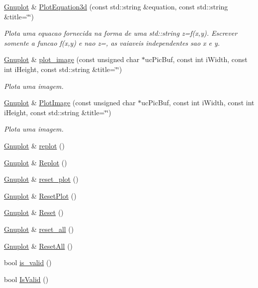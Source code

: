 \begin{DoxyCompactItemize}
\hyperlink{class_gnuplot}{Gnuplot} \& \hyperlink{class_gnuplot_a545ea6339c234d277339ab148cd11dba}{Plot\+Equation3d} (const std\+::string \&equation, const std\+::string \&title=\char`\"{}\char`\"{})
\begin{DoxyCompactList}\small\item\em Plota uma equacao fornecida na forma de uma std\+::string z=f(x,y). Escrever somente a funcao f(x,y) e nao z=, as vaiaveis independentes sao x e y. \end{DoxyCompactList}\item 
\hyperlink{class_gnuplot}{Gnuplot} \& \hyperlink{class_gnuplot_ab71117b8fa74d53ea20c313717d86b5c}{plot\+\_\+image} (const unsigned char $\ast$uc\+Pic\+Buf, const int i\+Width, const int i\+Height, const std\+::string \&title=\char`\"{}\char`\"{})
\begin{DoxyCompactList}\small\item\em Plota uma imagem. \end{DoxyCompactList}\item 
\hyperlink{class_gnuplot}{Gnuplot} \& \hyperlink{class_gnuplot_aeb28a013344a81314bf831e14623154e}{Plot\+Image} (const unsigned char $\ast$uc\+Pic\+Buf, const int i\+Width, const int i\+Height, const std\+::string \&title=\char`\"{}\char`\"{})
\begin{DoxyCompactList}\small\item\em Plota uma imagem. \end{DoxyCompactList}\item 
\hyperlink{class_gnuplot}{Gnuplot} \& \hyperlink{class_gnuplot_ae4f110479cfd8dc9b1b3d45809fb05e0}{replot} ()
\item 
\hyperlink{class_gnuplot}{Gnuplot} \& \hyperlink{class_gnuplot_a565fb1504cd88277e3c2092ad2234234}{Replot} ()
\item 
\hyperlink{class_gnuplot}{Gnuplot} \& \hyperlink{class_gnuplot_a6797761712d3c311e3685bcccba65dd4}{reset\+\_\+plot} ()
\item 
\hyperlink{class_gnuplot}{Gnuplot} \& \hyperlink{class_gnuplot_a5180044de81d85bcd81aa7e9376eb9d1}{Reset\+Plot} ()
\item 
\hyperlink{class_gnuplot}{Gnuplot} \& \hyperlink{class_gnuplot_ae32093aa955bc31938d9cb266085ae4b}{Reset} ()
\item 
\hyperlink{class_gnuplot}{Gnuplot} \& \hyperlink{class_gnuplot_a9aedfe8371083a1a3ac2b9493810049c}{reset\+\_\+all} ()
\item 
\hyperlink{class_gnuplot}{Gnuplot} \& \hyperlink{class_gnuplot_ae9e88b397cc6ddd052f6378a58373b0c}{Reset\+All} ()
\item 
bool \hyperlink{class_gnuplot_a3135ffebb308b50c4f3178a62b23ab03}{is\+\_\+valid} ()
\item 
bool \hyperlink{class_gnuplot_af1af0e2a0b3661df825b4e7b1f7e8d94}{Is\+Valid} ()
\end{DoxyCompactItemize}
